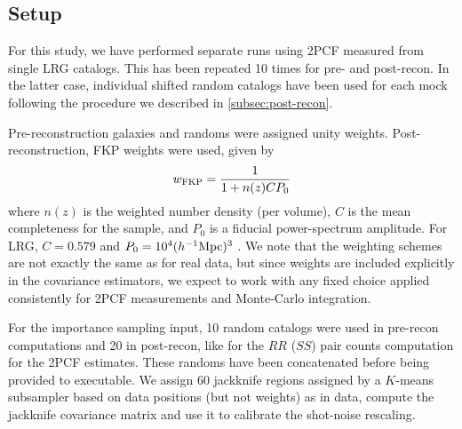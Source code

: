 \subsection{Setup}
\label{subsec:validation-setup}

For this study, we have performed separate runs using 2PCF measured from single LRG \themocks{} catalogs.
This has been repeated 10 times for pre- and post-recon.
In the latter case, individual shifted random catalogs have been used for each mock following the procedure we described in \cref{subsec:post-recon}.

Pre-reconstruction galaxies and randoms were assigned unity weights.
Post-reconstruction, FKP weights \citep{FKP} were used, given by
\begin{equation}
    w_{\rm FKP} = \frac{1}{1+n(z) C P_0}
\end{equation}
where $n(z)$ is the weighted number density (per volume),
$C$ is the mean completeness for the sample,
and $P_0$ is a fiducial power-spectrum amplitude.
For LRG, $C=0.579$ and $P_0=10^4 (h^{-1}{\rm Mpc})^3$ \citep{BAO.EDR.Moon.2023}.
We note that the weighting schemes are not exactly the same as for real data, but since weights are included explicitly in the covariance estimators, we expect \rascalc{} to work with any fixed choice applied consistently for 2PCF measurements and Monte-Carlo integration.

For the importance sampling input, 10 random catalogs were used in pre-recon computations and 20 in post-recon, like for the $RR$ ($SS$) pair counts computation for the 2PCF estimates.
These randoms have been concatenated before being provided to \rascalc{} executable.
We assign 60 jackknife regions assigned by a $K$-means subsampler based on data positions (but not weights) as in \desimtwo{} data, compute the jackknife covariance matrix and use it to calibrate the shot-noise rescaling.

